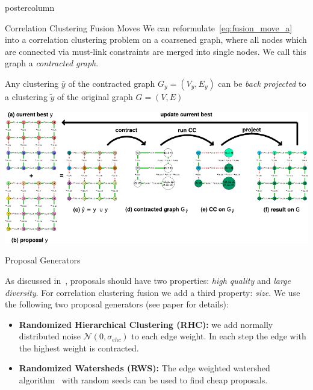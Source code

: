 \documentclass[final,hyperref={pdfpagelabels=false}]{beamer}
\begin{document}
\begin{frame}
\begin{columns}
\begin{column}{.49\textwidth}
\begin{beamercolorbox}[center,wd=\textwidth]{postercolumn}
\begin{minipage}[T]{.95\textwidth}
{\begin{block}{Correlation Clustering Fusion Moves}
              We can reformulate~\ref{eq:fusion_move_a}
              into a correlation clustering problem on a coarsened graph, where all nodes which are connected
              via must-link constraints are merged into single nodes. We call this graph a \emph{contracted graph}.

              Any clustering $\bar{y}$ of the contracted graph $G_y=(V_y,E_y)$ can be \emph{back projected} to a clustering $\tilde{y}$ of the original graph $G=(V,E)$

              \vfill
              \vspace{2cm}
              \centering
              \includegraphics[width=1.0\linewidth]{si-crop.pdf}


            \end{block}
            \vfill
            \begin{block}{Proposal Generators}

            As discussed in~\cite{Lempitsky-2010}, proposals
            should have two properties: \emph{high quality} 
            and \emph{large diversity}.
            For correlation clustering fusion we add a third
            property: \emph{size}.
            We use the following two proposal generators (see paper for details):
            \begin{itemize}
                \item \textbf{Randomized Hierarchical Clustering (RHC):}
                we add normally distributed noise  $\mathcal{N}(0, \sigma_{ehc})$ to each edge weight.
                In each step the edge with the highest weight is contracted.

                \item \textbf{Randomized Watersheds (RWS):}
                The edge weighted watershed algorithm~\cite{meyer_2013}
                with random seeds can be used to find
                cheap proposals.
            \end{itemize}


\end{block}}
\end{minipage}
\end{beamercolorbox}
\end{column}
\end{columns}
\end{frame}
\end{document}
